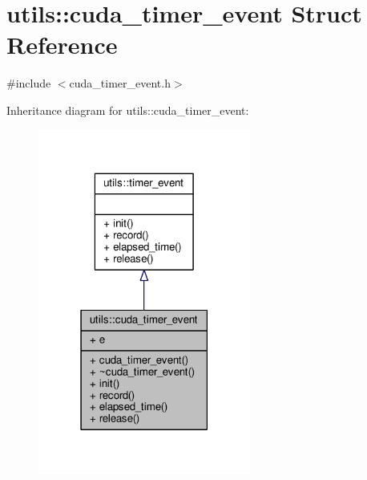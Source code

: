 \hypertarget{structutils_1_1cuda__timer__event}{\section{utils\-:\-:cuda\-\_\-timer\-\_\-event Struct Reference}
\label{structutils_1_1cuda__timer__event}
}


{\ttfamily \#include $<$cuda\-\_\-timer\-\_\-event.\-h$>$}



Inheritance diagram for utils\-:\-:cuda\-\_\-timer\-\_\-event\-:\nopagebreak
\begin{figure}[H]
\begin{center}
\leavevmode
\includegraphics[width=198pt]{structutils_1_1cuda__timer__event__inherit__graph}
\end{center}
\end{figure}


